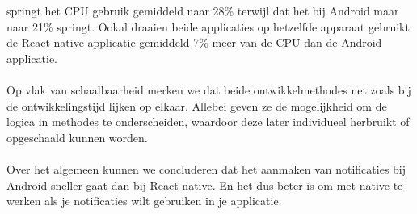 springt het CPU gebruik gemiddeld naar 28\% terwijl dat het bij Android maar naar 21\% springt. Ookal 
draaien beide applicaties op hetzelfde apparaat gebruikt de React native applicatie gemiddeld 7\% meer 
van de CPU dan de Android applicatie.
\\\\
Op vlak van schaalbaarheid merken we dat beide ontwikkelmethodes net zoals bij de ontwikkelingstijd 
lijken op elkaar. Allebei geven ze de mogelijkheid om de logica in methodes te onderscheiden, 
waardoor deze later individueel herbruikt of opgeschaald kunnen worden.
\\\\
Over het algemeen kunnen we concluderen dat het aanmaken van notificaties bij Android sneller gaat dan bij
React native. En het dus beter is om met native te werken als je notificaties wilt gebruiken in je applicatie.























